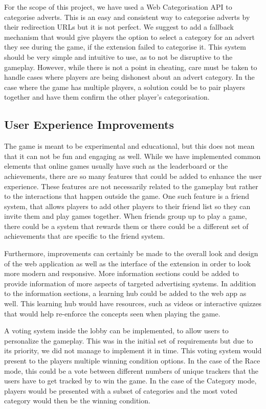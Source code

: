 \documentclass{l4proj}
\begin{document}
For the scope of this project, we have used a Web Categorisation API to categorise adverts. This is an easy and consistent way to categorise adverts by their redirection URLs but it is not perfect. We suggest to add a fallback mechanism that would give players the option to select a category for an advert they see during the game, if the extension failed to categorise it. This system should be very simple and intuitive to use, as to not be disruptive to the gameplay. However, while there is not a point in cheating, care must be taken to handle cases where players are being dishonest about an advert category. In the case where the game has multiple players, a solution could be to pair players together and have them confirm the other player's categorisation.

\subsection{User Experience Improvements}
The game is meant to be experimental and educational, but this does not mean that it can not be fun and engaging as well. While we have implemented common elements that online games usually have such as the leaderboard or the achievements, there are so many features that could be added to enhance the user experience. These features are not necessarily related to the gameplay but rather to the interactions that happen outside the game. One such feature is a friend system, that allows players to add other players to their friend list so they can invite them and play games together. When friends group up to play a game, there could be a system that rewards them or there could be a different set of achievements that are specific to the friend system. 

Furthermore, improvements can certainly be made to the overall look and design of the web application as well as the interface of the extension in order to look more modern and responsive.
More information sections could be added to provide information of more aspects of targeted advertising systems. In addition to the information sections, a learning hub could be added to the web app as well. This learning hub would have resources, such as videos or interactive quizzes that would help re-enforce the concepts seen when playing the game.

A voting system inside the lobby can be implemented, to allow users to personalize the gameplay. This was in the initial set of requirements but due to its priority, we did not manage to implement it in time. This voting system would present to the players multiple winning condition options. In the case of the Race mode, this could be a vote between different numbers of unique trackers that the users have to get tracked by to win the game. In the case of the Category mode, players would be presented with a subset of categories and the most voted category would then be the winning condition.
\end{document}

